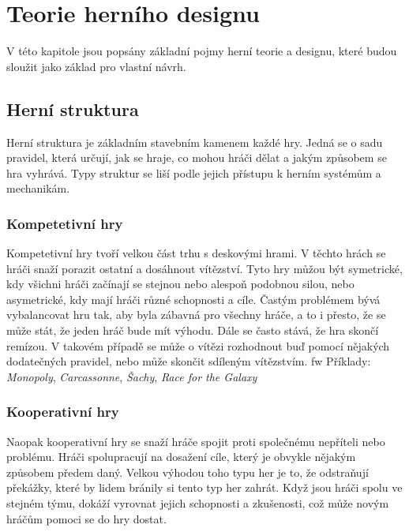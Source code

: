 \chapter{Teorie herního designu}
\label{chap:game_design}

V této kapitole jsou popsány základní pojmy herní teorie a designu, které budou sloužit jako základ pro vlastní návrh. \cite{building_blocks_of_tabletop_design_2022}



\section{Herní struktura}
\label{sec:structure}

Herní struktura je základním stavebním kamenem každé hry. Jedná se o sadu pravidel, která určují, jak se hraje, co mohou hráči dělat a jakým způsobem se hra vyhrává. Typy struktur se liší podle jejich přístupu k herním systémům a mechanikám. 

\subsection{Kompetetivní hry}
\label{subsec:structure_competitive}

Kompetetivní hry tvoří velkou část trhu s deskovými hrami. V těchto hrách se hráči snaží porazit ostatní a dosáhnout vítězství. Tyto hry můžou být symetrické, kdy všichni hráči začínají se stejnou nebo alespoň podobnou silou, nebo asymetrické, kdy mají hráči různé schopnosti a cíle. Častým problémem bývá vybalancovat hru tak, aby byla zábavná pro všechny hráče, a to i přesto, že se může stát, že jeden hráč bude mít výhodu. Dále se často stává, že hra skončí remízou. V takovém případě se může o vítězi rozhodnout buď pomocí nějakých dodatečných pravidel, nebo může skončit sdíleným vítězstvím.
\gls{fw}
Příklady: \textit{Monopoly}, \textit{Carcassonne}, \textit{Šachy}, \textit{Race for the Galaxy}

\subsection{Kooperativní hry}
\label{subsec:structure_cooperative}

Naopak kooperativní hry se snaží hráče spojit proti společnému nepříteli nebo problému. Hráči spolupracují na dosažení cíle, který je obvykle nějakým způsobem předem daný. Velkou výhodou toho typu her je to, že odstraňují překážky, které by lidem bránily si tento typ her zahrát. Když jsou hráči spolu ve stejném týmu, dokáží vyrovnat jejich schopnosti a zkušenosti, což může novým hráčům pomoci se do hry dostat.


